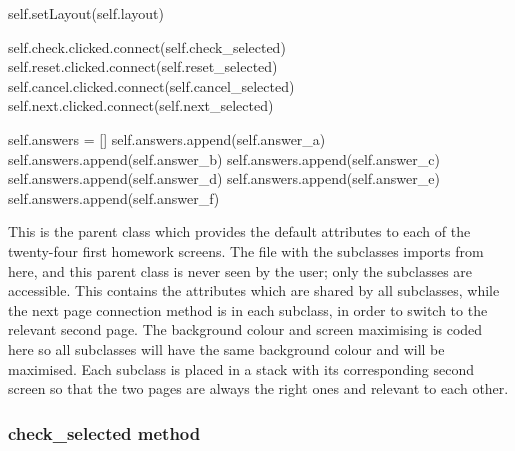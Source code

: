 \begin{python}
        self.setLayout(self.layout)

        self.check.clicked.connect(self.check_selected)
        self.reset.clicked.connect(self.reset_selected)
        self.cancel.clicked.connect(self.cancel_selected)
        self.next.clicked.connect(self.next_selected)

        self.answers = []
        self.answers.append(self.answer_a)
        self.answers.append(self.answer_b)
        self.answers.append(self.answer_c)
        self.answers.append(self.answer_d)
        self.answers.append(self.answer_e)
        self.answers.append(self.answer_f)
\end{python}

This is the parent class which provides the default attributes to each of the twenty-four first homework screens. The file with the subclasses imports from here, and this parent class is never seen by the user; only the subclasses are accessible. This contains the attributes which are shared by all subclasses, while the next page connection method is in each subclass, in order to switch to the relevant second page. The background colour and screen maximising is coded here so all subclasses will have the same background colour and will be maximised. Each subclass is placed in a stack with its corresponding second screen so that the two pages are always the right ones and relevant to each other.

\subsubsection{check\_selected method}

